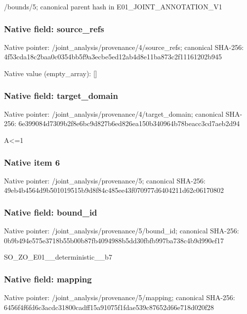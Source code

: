 \documentclass[10pt,a4paper]{article}
\begin{document}
\begingroup\raggedright\sloppy /\allowbreak{}bounds/\allowbreak{}5;\allowbreak{} canonical parent hash in E01\_\allowbreak{}JOINT\_\allowbreak{}ANNOTATION\_\allowbreak{}V1\par\endgroup

\subsubsection{Native field: source\_\allowbreak{}refs}
Native pointer: /joint\_\allowbreak{}analysis/provenance/4/source\_\allowbreak{}refs; canonical SHA-256: 4f53cda18c2baa0c0354bb5f9a3ecbe5ed12ab4d8e11ba873c2f11161202b945

Native value (empty\_\allowbreak{}array): []

\subsubsection{Native field: target\_\allowbreak{}domain}
Native pointer: /joint\_\allowbreak{}analysis/provenance/4/target\_\allowbreak{}domain; canonical SHA-256: 6e399084d7309b2f8e6bc9d827b6ed826ea150b340964b78beacc3cd7aeb2d94

\begingroup\raggedright\sloppy A<=\allowbreak{}1\par\endgroup

\subsubsection{Native item 6}
Native pointer: /joint\_\allowbreak{}analysis/provenance/5; canonical SHA-256: 49eb4b4564d9b501019515b9d8f84c485ee43f070977d6404211d62c06170802

\subsubsection{Native field: bound\_\allowbreak{}id}
Native pointer: /joint\_\allowbreak{}analysis/provenance/5/bound\_\allowbreak{}id; canonical SHA-256: 0b9b494e575e3718b55b00b87fb4094988b5dd30fbfb997ba738c4b9d990ef17

\begingroup\raggedright\sloppy SO\_\allowbreak{}ZO\_\allowbreak{}E01\_\allowbreak{}\_\allowbreak{}deterministic\_\allowbreak{}\_\allowbreak{}b7\par\endgroup

\subsubsection{Native field: mapping}
Native pointer: /joint\_\allowbreak{}analysis/provenance/5/mapping; canonical SHA-256: 6456f4f6fd6c3acdc31800cadff15a91075f1fdae539c87652d66e718d020f28
\end{document}
